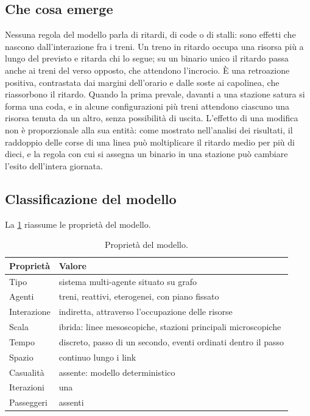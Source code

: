 \subsection{Che cosa emerge}
Nessuna regola del modello parla di ritardi, di code o di stalli: sono effetti che nascono dall'interazione fra i treni. Un treno in ritardo occupa una risorsa più a lungo del previsto e ritarda chi lo segue; su un binario unico il ritardo passa anche ai treni del verso opposto, che attendono l'incrocio. È una retroazione positiva, contrastata dai margini dell'orario e dalle soste ai capolinea, che riassorbono il ritardo. Quando la prima prevale, davanti a una stazione satura si forma una coda, e in alcune configurazioni più treni attendono ciascuno una risorsa tenuta da un altro, senza possibilità di uscita. L'effetto di una modifica non è proporzionale alla sua entità: come mostrato nell'analisi dei risultati, il raddoppio delle corse di una linea può moltiplicare il ritardo medio per più di dieci, e la regola con cui si assegna un binario in una stazione può cambiare l'esito dell'intera giornata.

\subsection{Classificazione del modello}
La \cref{tab:modello-proprieta} riassume le proprietà del modello.

\begin{table}[H]
	\centering
	\caption{Proprietà del modello.}
	\label{tab:modello-proprieta}
	\begin{tabularx}{\textwidth}{lX}
		\toprule
		Proprietà & Valore \\
		\midrule
		Tipo & sistema multi-agente situato su grafo \\
		Agenti & treni, reattivi, eterogenei, con piano fissato \\
		Interazione & indiretta, attraverso l'occupazione delle risorse \\
		Scala & ibrida: linee mesoscopiche, stazioni principali microscopiche \\
		Tempo & discreto, passo di un secondo, eventi ordinati dentro il passo \\
		Spazio & continuo lungo i link \\
		Casualità & assente: modello deterministico \\
		Iterazioni & una \\
		Passeggeri & assenti \\
		\bottomrule
	\end{tabularx}
\end{table}

